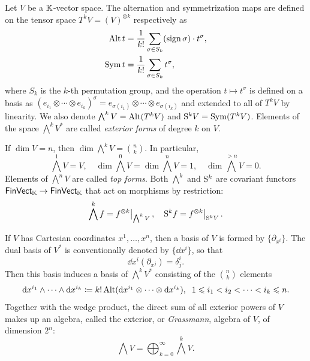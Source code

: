 \begin{defn}
    Let $V$ be a $\mathbb{K}$-vector space. The alternation and symmetrization maps are defined on the tensor space $T^k V=(V)^{\otimes k}$ respectively as
    \begin{align}
        \operatorname{Alt} t&=\frac{1}{k!}\sum_{\sigma\in S_k} (\operatorname{sign}\sigma)\cdot t^\sigma,\\
        \operatorname{Sym} t&=\frac{1}{k!}\sum_{\sigma\in S_k} t^\sigma,\label{def sym operator}
    \end{align}
    where $S_k$ is the $k$-th permutation group, and the operation $t\mapsto t^\sigma$ is defined on a basis as $(e_{i_1}\otimes\cdots\otimes e_{i_k})^\sigma=e_{\sigma(i_1)}\otimes\cdots\otimes e_{\sigma(i_k)}$ and extended to all of $T^k V$ by linearity. We also denote $\bigwedge^k V=\operatorname{Alt}(T^k V)$ and $\mathrm{S}^k V=\operatorname{Sym}(T^k V)$. Elements of the space $\bigwedge^k V^\ast$ are called \emph{exterior forms} of degree $k$ on $V$. 
    
    If $\dim V=n$, then $\dim \bigwedge^k V=\binom{n}{k}$. In particular, 
    \[\bigwedge^1 V=V,\quad \dim \bigwedge^0 V=\dim \bigwedge^n V=1,\quad \dim \bigwedge^{>n} V=0.\]
    Elements of $\bigwedge^n V$ are called \emph{top forms}.
    Both $\bigwedge^k$ and $\mathrm{S}^k$ are covariant functors $\mathsf{FinVect}_{\mathbb{K}}\to\mathsf{FinVect}_{\mathbb{K}}$ that act on morphisms by restriction: \[\bigwedge^k f=\restr{f^{\otimes k}}{\bigwedge^k V},\quad \rmS^k f=\restr{f^{\otimes k}}{\rmS^k V}.\]
\end{defn}

If $V$ has Cartesian coordinates $x^1,\ldots,x^n$, then a basis of $V$ is formed by $\{\partial_{x^i}\}$. The dual basis of $V^\ast$ is conventionally denoted by $\{\dd x^i\}$, so that
\[
    \dd x^i\left(\partial_{x^j}\right)=\delta^i_j.
\]
Then this basis induces a basis of $\bigwedge^k V^\ast$ consisting of the $\binom{n}{k}$ elements
\[
{\mathrm{d}} x^{i_1}\wedge \cdots \wedge {\mathrm{d}} x^{i_k}\coloneqq k!\operatorname{Alt}({\mathrm{d}} x^{i_1}\otimes\cdots\otimes {\mathrm{d}} x^{i_k}),\;\;1\leqslant i_1<i_2<\cdots<i_k\leqslant n.
\]
Together with the wedge product, the direct sum of all exterior powers of $V$ makes up an algebra, called the exterior, or \emph{Grassmann}, algebra of $V$, of dimension $2^n$:
\[\bigwedge V=\bigoplus_{k=0}^\infty \bigwedge^k V.\]



